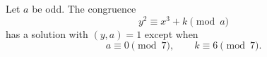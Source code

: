 \begin{proposition}
    Let $a$ be odd. The congruence
\[
    y^2\equiv x^3+k\pmod a
\]
    has a solution with $(y,a)=1$ except when
\[
    a\equiv0\pmod7,\qquad k\equiv6\pmod7.
\]
\end{proposition}
